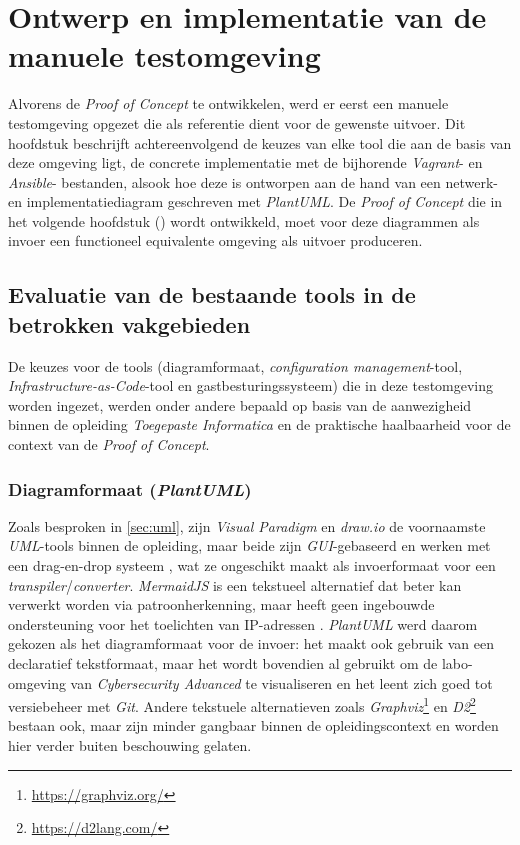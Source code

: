 
\chapter{Ontwerp en implementatie van de manuele testomgeving}%
\label{ch:manuele_testomgeving}

Alvorens de \emph{Proof of Concept} te ontwikkelen, werd er eerst een manuele testomgeving opgezet die als referentie dient voor de gewenste uitvoer. Dit hoofdstuk beschrijft achtereenvolgend de keuzes van elke tool die aan de basis van deze omgeving ligt, de concrete implementatie met de bijhorende \emph{Vagrant}- en \emph{Ansible}- bestanden, alsook hoe deze is ontworpen aan de hand van een netwerk- en implementatiediagram geschreven met \emph{PlantUML}. De \emph{Proof of Concept} die in het volgende hoofdstuk () wordt ontwikkeld, moet voor deze diagrammen als invoer een functioneel equivalente omgeving als uitvoer produceren.

\section{Evaluatie van de bestaande tools in de betrokken vakgebieden}%
\label{sec:toolkeuze}

De keuzes voor de tools (diagramformaat, \emph{configuration management}-tool, \emph{Infrastructure-as-Code}-tool en gastbesturingssysteem) die in deze testomgeving worden ingezet, werden onder andere bepaald op basis van de aanwezigheid binnen de opleiding \emph{Toegepaste Informatica} en de praktische haalbaarheid voor de context van de \emph{Proof of Concept}.

\subsection{Diagramformaat (\emph{PlantUML})}%

Zoals besproken in \autoref{sec:uml}, zijn \emph{Visual Paradigm} en \emph{draw.io} de voornaamste \emph{UML}-tools binnen de opleiding, maar beide zijn \emph{GUI}-gebaseerd en werken met een drag-en-drop systeem \autocite{Lu2023}, wat ze ongeschikt maakt als invoerformaat voor een \emph{transpiler}/\emph{converter}. \emph{MermaidJS} is een tekstueel alternatief dat beter kan verwerkt worden via patroonherkenning, maar heeft geen ingebouwde ondersteuning voor het toelichten van IP-adressen \autocite{Mermaid2026}. \emph{PlantUML} werd daarom gekozen als het diagramformaat voor de invoer: het maakt ook gebruik van een declaratief tekstformaat, maar het wordt bovendien al gebruikt om de labo-omgeving van \emph{Cybersecurity Advanced} te visualiseren \autocite{HoGentTIN2025} en het leent zich goed tot versiebeheer met \emph{Git}. Andere tekstuele alternatieven zoals \emph{Graphviz}\footnote{\url{https://graphviz.org/}} en \emph{D2}\footnote{\url{https://d2lang.com/}} bestaan ook, maar zijn minder gangbaar binnen de opleidingscontext en worden hier verder buiten beschouwing gelaten.

